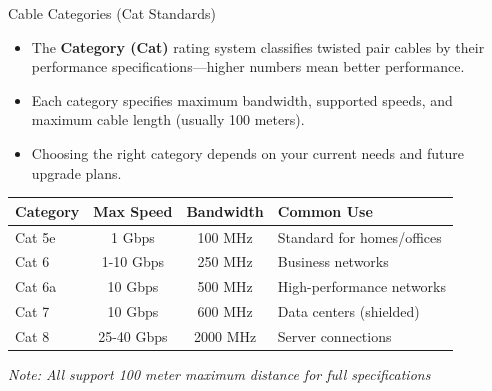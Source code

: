 \documentclass[aspectratio=169]{beamer}
\begin{document}
\begin{frame}{Cable Categories (Cat Standards)}
    \begin{itemize}
        \item The \textbf{Category (Cat)} rating system classifies twisted pair cables by their performance specifications---higher numbers mean better performance.
        \item Each category specifies maximum bandwidth, supported speeds, and maximum cable length (usually 100 meters).
        \item Choosing the right category depends on your current needs and future upgrade plans.
    \end{itemize}
    
    \vspace{0.3cm}
    \begin{table}
        \centering
        \small
        \begin{tabular}{|l|c|c|l|}
            \hline
            \rowcolor{networkblue!20}
            \textbf{Category} & \textbf{Max Speed} & \textbf{Bandwidth} & \textbf{Common Use} \\
            \hline
            Cat 5e & 1 Gbps & 100 MHz & Standard for homes/offices \\
            \hline
            Cat 6 & 1-10 Gbps & 250 MHz & Business networks \\
            \hline
            Cat 6a & 10 Gbps & 500 MHz & High-performance networks \\
            \hline
            Cat 7 & 10 Gbps & 600 MHz & Data centers (shielded) \\
            \hline
            Cat 8 & 25-40 Gbps & 2000 MHz & Server connections \\
            \hline
        \end{tabular}
    \end{table}
    
    \vspace{0.2cm}
    \small{\textit{Note: All support 100 meter maximum distance for full specifications}}
\end{frame}
\end{document}
